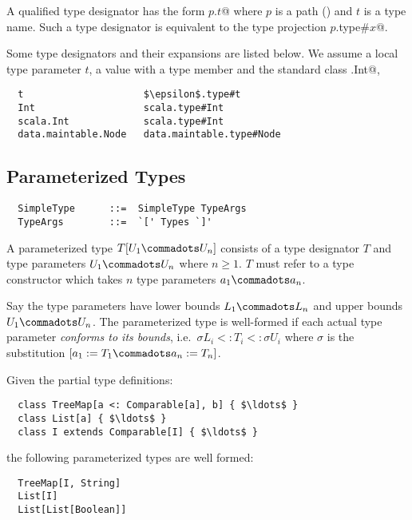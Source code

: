 A qualified type designator has the form \lstinline@$p$.$t$@ where $p$ is
a path () and $t$ is a type name. Such a type designator is
equivalent to the type projection \lstinline@$p$.type#$x$@.

\example 
Some type designators and their expansions are listed below. We assume
a local type parameter $t$, a value 
with a type member  and the standard class \lstinline@scala.Int@, 
\begin{lstlisting}
  t                     $\epsilon$.type#t
  Int                   scala.type#Int
  scala.Int             scala.type#Int
  data.maintable.Node   data.maintable.type#Node
\end{lstlisting}

\subsection{Parameterized Types}
\label{sec:param-types}

\syntax\begin{lstlisting}
  SimpleType      ::=  SimpleType TypeArgs
  TypeArgs        ::=  `[' Types `]'
\end{lstlisting}

A parameterized type $T[U_1 \commadots U_n]$ consists of a type
designator $T$ and type parameters $U_1 \commadots U_n$ where $n \geq
1$.  $T$ must refer to a type constructor which takes $n$ type
parameters $a_1 \commadots a_n$.

Say the type parameters have lower bounds $L_1 \commadots L_n$ and
upper bounds $U_1 \commadots U_n$.  The parameterized type is
well-formed if each actual type parameter {\em conforms to its
bounds}, i.e.\ $\sigma L_i <: T_i <: \sigma U_i$ where $\sigma$ is the
substitution $[a_1 := T_1 \commadots a_n := T_n]$.

\example\label{ex:param-types}
Given the partial type definitions:

\begin{lstlisting}
  class TreeMap[a <: Comparable[a], b] { $\ldots$ }
  class List[a] { $\ldots$ }
  class I extends Comparable[I] { $\ldots$ }
\end{lstlisting}

the following parameterized types are well formed:

\begin{lstlisting}
  TreeMap[I, String]
  List[I]
  List[List[Boolean]]
\end{lstlisting}

